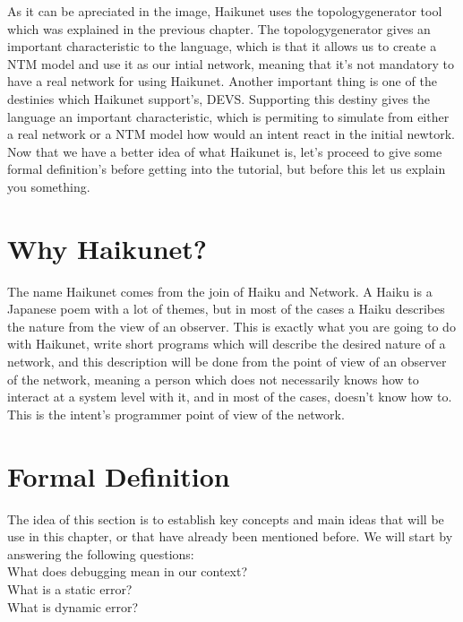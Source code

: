As it can be apreciated in the image, Haikunet uses the topologygenerator tool which was explained in the previous chapter. The topologygenerator gives an important characteristic to the language, which is that it allows us to create a NTM model and use it as our intial network, meaning that it's not mandatory to have a real network for using Haikunet. Another important thing is one of the destinies which Haikunet support's, DEVS. Supporting this destiny gives the language an important characteristic, which is permiting to simulate from either a real network or a NTM model how would an intent react in the initial newtork.\\

Now that we have a better idea of what Haikunet is, let's proceed to give some formal definition's before getting into the tutorial, but before this let us explain you something.

\section{Why Haikunet?}

The name Haikunet comes from the join of Haiku and Network. A Haiku is a Japanese poem with a lot of themes, but in most of the cases a Haiku describes the nature from the view of an observer. This is exactly what you are going to do with Haikunet, write short programs which will describe the desired nature of a network, and this description will be done from the point of view of an observer of the network, meaning a person which does not necessarily knows how to interact at a system level with it, and in most of the cases, doesn't know how to. This is the intent's programmer point of view of the network. 

\section{Formal Definition}

The idea of this section is to establish key concepts and main ideas that will be use in this chapter, or that have already been mentioned before. We will start by answering the following questions:\\

What does debugging mean in our context?\\

What is a static error?\\

What is dynamic error?\\

